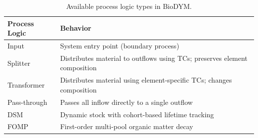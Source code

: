 \begin{table}[h]
\centering
\begin{tabular}{lp{9cm}}
\toprule
\textbf{Process Logic} & \textbf{Behavior} \\
\midrule
Input & System entry point (boundary process) \\
Splitter & Distributes material to outflows using TCs; preserves element composition \\
Transformer & Distributes material using element-specific TCs; changes composition \\
Pass-through & Passes all inflow directly to a single outflow \\
DSM & Dynamic stock with cohort-based lifetime tracking \\
FOMP & First-order multi-pool organic matter decay \\
\bottomrule
\end{tabular}
\caption{Available process logic types in BioDYM.}
\label{tab:process-types}
\end{table}
